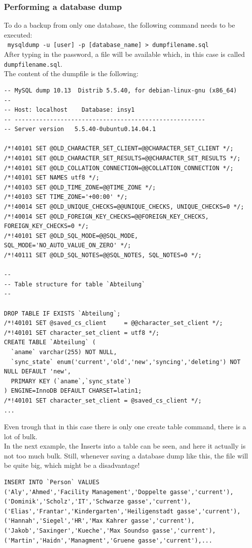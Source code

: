\documentclass[10pt]{article}
\begin{document}
\subsubsection{Performing a database dump}
To do a backup from only one database, the following command needs to be executed: \\
\texttt{ mysqldump -u [user] -p [database\_name] \textgreater ~dumpfilename.sql } \\
After typing in the password, a file will be available which, in this case is called \texttt{dumpfilename.sql}.\\ 
The content of the dumpfile is the following:
\begin{lstlisting}    
-- MySQL dump 10.13  Distrib 5.5.40, for debian-linux-gnu (x86_64)
--
-- Host: localhost    Database: insy1
-- ------------------------------------------------------
-- Server version	5.5.40-0ubuntu0.14.04.1

/*!40101 SET @OLD_CHARACTER_SET_CLIENT=@@CHARACTER_SET_CLIENT */;
/*!40101 SET @OLD_CHARACTER_SET_RESULTS=@@CHARACTER_SET_RESULTS */;
/*!40101 SET @OLD_COLLATION_CONNECTION=@@COLLATION_CONNECTION */;
/*!40101 SET NAMES utf8 */;
/*!40103 SET @OLD_TIME_ZONE=@@TIME_ZONE */;
/*!40103 SET TIME_ZONE='+00:00' */;
/*!40014 SET @OLD_UNIQUE_CHECKS=@@UNIQUE_CHECKS, UNIQUE_CHECKS=0 */;
/*!40014 SET @OLD_FOREIGN_KEY_CHECKS=@@FOREIGN_KEY_CHECKS, FOREIGN_KEY_CHECKS=0 */;
/*!40101 SET @OLD_SQL_MODE=@@SQL_MODE, SQL_MODE='NO_AUTO_VALUE_ON_ZERO' */;
/*!40111 SET @OLD_SQL_NOTES=@@SQL_NOTES, SQL_NOTES=0 */;

--
-- Table structure for table `Abteilung`
--

DROP TABLE IF EXISTS `Abteilung`;
/*!40101 SET @saved_cs_client     = @@character_set_client */;
/*!40101 SET character_set_client = utf8 */;
CREATE TABLE `Abteilung` (
  `aname` varchar(255) NOT NULL,
  `sync_state` enum('current','old','new','syncing','deleting') NOT NULL DEFAULT 'new',
  PRIMARY KEY (`aname`,`sync_state`)
) ENGINE=InnoDB DEFAULT CHARSET=latin1;
/*!40101 SET character_set_client = @saved_cs_client */;
...
\end{lstlisting}    
Even trough that in this case there is only one create table command, there is a lot of bulk. \\
In the next example, the Inserts into a table can be seen, and here it actually is not too much bulk.
Still, whenever saving a database dump like this, the file will be quite big, which might be a disadvantage! 
\begin{lstlisting}    
INSERT INTO `Person` VALUES 
('Aly','Ahmed','Facility Management','Doppelte gasse','current'),
('Dominik','Scholz','IT','Schwarze gasse','current'),
('Elias','Frantar','Kindergarten','Heiligenstadt gasse','current'),
('Hannah','Siegel','HR','Max Kahrer gasse','current'),
('Jakob','Saxinger','Kueche','Max Soundso gasse','current'),
('Martin','Haidn','Managment','Gruene gasse','current'),...
\end{lstlisting}    
\end{document}

